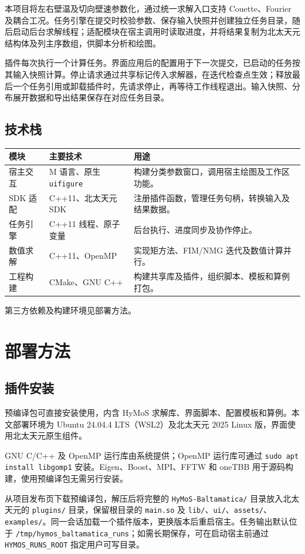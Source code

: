 \documentclass[UTF8,a4paper,11pt,fontset=fandol]{ctexart}
\newcommand{\code}[1]{\nolinkurl{#1}}
\begin{document}
本项目将左右壁温及切向壁速参数化，通过统一求解入口支持 Couette、Fourier 及耦合工况。任务引擎在提交时校验参数、保存输入快照并创建独立任务目录，随后启动后台求解线程；适配模块在宿主调用时读取进度，并将结果复制为北太天元结构体及列主序数组，供脚本分析和绘图。

插件每次执行一个计算任务。界面应用后的配置用于下一次提交，已启动的任务按其输入快照计算。停止请求通过共享标记传入求解器，在迭代检查点生效；释放最后一个任务引用或卸载插件时，先请求停止，再等待工作线程退出。输入快照、分布展开数据和导出结果保存在对应任务目录。

\subsection{技术栈}
\begin{center}\small
\begin{tabularx}{\textwidth}{@{}p{26mm}p{45mm}Y@{}}
\toprule
模块 & 主要技术 & 用途\\
\midrule
宿主交互 & M 语言、原生 \texttt{uifigure} & 构建分类参数窗口，调用宿主绘图及工作区功能。\\
SDK 适配 & C++11、北太天元 SDK & 注册插件函数，管理任务句柄，转换输入及结果数据。\\
任务引擎 & C++11 线程、原子变量 & 后台执行、进度同步及协作停止。\\
数值求解 & C++11、OpenMP & 实现矩方法、FIM/NMG 迭代及数值计算并行。\\
工程构建 & CMake、GNU C++ & 构建共享库及插件，组织脚本、模板和算例打包。\\
\bottomrule
\end{tabularx}
\end{center}
第三方依赖及构建环境见部署方法。
\section{部署方法}
\subsection{插件安装}
预编译包可直接安装使用，内含 HyMoS 求解库、界面脚本、配置模板和算例。本文部署环境为 Ubuntu 24.04.4 LTS（WSL2）及北太天元 2025 Linux 版，界面使用北太天元原生组件。

GNU C/C++ 及 OpenMP 运行库由系统提供；OpenMP 运行库可通过 \texttt{sudo apt install libgomp1} 安装。Eigen、Boost、MPI、FFTW 和 oneTBB 用于源码构建，使用预编译包无需另行安装。

从项目发布页下载预编译包，解压后将完整的 \code{HyMoS-Baltamatica/} 目录放入北太天元的 \code{plugins/} 目录，保留根目录的 \code{main.so} 及 \code{lib/}、\code{ui/}、\code{assets/}、\code{examples/}。同一会话加载一个插件版本，更换版本后重启宿主。任务输出默认位于 \code{/tmp/hymos_baltamatica_runs}；如需长期保存，可在启动宿主前通过 \code{HYMOS_RUNS_ROOT} 指定用户可写目录。
\end{document}
